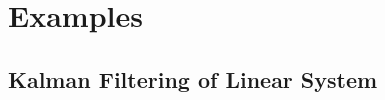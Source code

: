 \documentclass[11pt, oneside, a4paper]{article}
\begin{document}
\tableofcontents        	%
\newpage
\listoffigures		%




\appendix               	%
\section{Examples} 
\subsection{Kalman Filtering of Linear System} \label{ExampleKF} 

\end{document}
